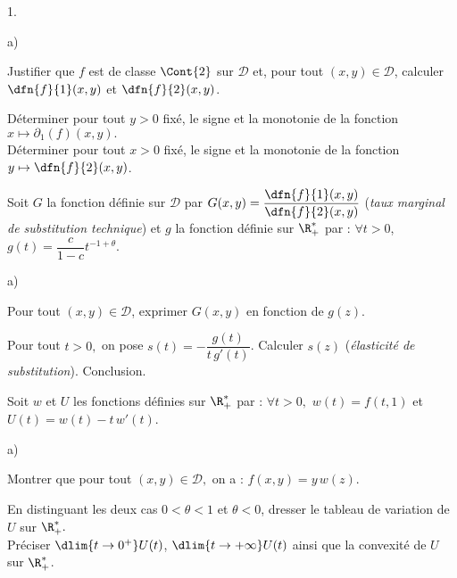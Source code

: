 \begin{noliste}{1.}
\begin{noliste}{a)}
  

  
  \item Justifier que $f$ est de classe $\Cont{2}$ sur $\mathcal{D}$ 
  et, pour tout $(x,y) \in \mathcal{D}$, calculer $\dfn{f}{1}(x,y)$ et 
  $\dfn{f}{2}(x,y)$.
  
  
  
  
  
  
  
  

  
  \item Déterminer pour tout $y>0$ fixé, le signe et la monotonie de la 
  fonction $x \mapsto \partial_1(f)(x,y).$\\
  Déterminer pour tout $x>0$ fixé, le signe et la monotonie de 
  la fonction $y \mapsto \dfn{f}{2}(x,y)$.
  
  

 \end{noliste}
 
 \item Soit $G$ la fonction définie sur $\mathcal{D}$ par 
 $G(x,y)=\dfrac{\dfn{f}{1}(x,y)}{\dfn{f}{2}(x,y)}$ 
 ({\it taux marginal de substitution technique}) et $g$ la fonction 
 définie sur $\R_+^*$ par : $\forall t>0$, 
 $g(t)=\dfrac{c}{1-c}t^{-1+\theta}$.
 \begin{noliste}{a)}
  \setlength{\itemsep}{2mm}
  \item Pour tout $(x,y) \in \mathcal{D}$, exprimer $G(x,y)$ en 
  fonction de $g(z)$.
  
  

  
  \item\label{3b} Pour tout $t>0,$ on pose $s(t)=-\dfrac{g(t)}{t 
  \, g'(t)}$.
  Calculer $s(z)$ ({\it élasticité de substitution}). Conclusion.
  
  
 \end{noliste}
 
 
 
 
 
 
 
 
 \item Soit $w$ et $U$ les fonctions définies sur $\R_+^*$ par :
 $\forall t>0,$ $w(t)=f(t,1)$ et $U(t)=w(t)-t \, w'(t)$.
 \begin{noliste}{a)}
  \setlength{\itemsep}{2mm}
  \item Montrer que pour tout $(x,y) \in \mathcal{D},$ on a : 
  $f(x,y)=y \, w(z)$.
  
  

  
  \item En distinguant les deux cas $0 < \theta < 1$ et $\theta < 0$, 
  dresser le tableau de variation de $U$ sur $\R_+^*.$\\
  Préciser $\dlim{t \to 0^+} U(t)$, $\dlim{t \to + \infty} U(t)$ ainsi 
  que la convexité de $U$ sur $\R_+^*$.
  
  
 \end{noliste}
\end{noliste}





